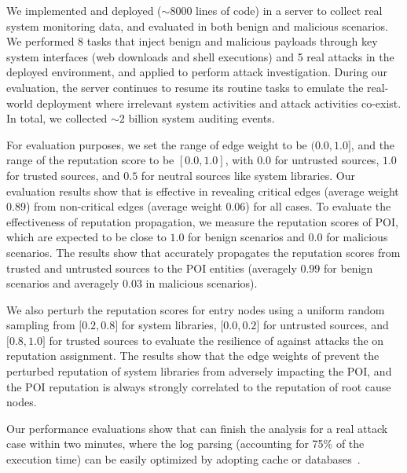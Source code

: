 We implemented and deployed \tool ($\sim$8000 lines of code) in a server to collect real system monitoring data,
and evaluated \tool in both benign and malicious scenarios.
We performed 8 tasks that inject benign and malicious payloads through key system interfaces (\eg web downloads and shell executions)
and 5 real 
attacks in the deployed environment,
and applied \tool to perform 
attack investigation.
During our evaluation, the server continues to resume its routine tasks to emulate the real-world deployment where irrelevant system activities and attack activities co-exist.
In total, we collected ${\sim}2$ billion system auditing events.

For evaluation purposes, we set the range of edge weight to be $(0.0,1.0]$,
and the range of the reputation score to be $[0.0,1.0]$, with $0.0$ for untrusted sources,
$1.0$ for trusted sources,
and $0.5$ for neutral sources like system libraries.
Our evaluation results show that \tool is effective in revealing critical edges (average weight 0.89) from non-critical edges (average weight 0.06) for all cases.
To evaluate the effectiveness of reputation propagation, we measure the reputation scores of POI, which are expected to be close to $1.0$ for benign scenarios and $0.0$ for malicious scenarios.
The results show that \tool accurately propagates the reputation scores from trusted and untrusted
sources to the POI entities (averagely $0.99$ for benign scenarios and averagely $0.03$ in malicious scenarios).

We also perturb the reputation scores for entry nodes using a uniform random sampling from $\lbrack0.2,0.8\rbrack$ for system libraries, $\lbrack0.0,0.2\rbrack$ for untrusted sources, and $\lbrack0.8,1.0\rbrack$ for trusted sources to evaluate the resilience of \tool against attacks the on reputation assignment.
The results show that the edge weights of \tool prevent the perturbed reputation of system libraries from adversely impacting the POI, and the POI reputation is always strongly correlated to the reputation of root cause nodes.

Our performance evaluations show that \tool can finish the analysis for a real attack case within two minutes, where the log parsing (accounting for 75\% of the execution time) can be easily optimized by adopting cache or databases~\cite{gao2018aiql}.



